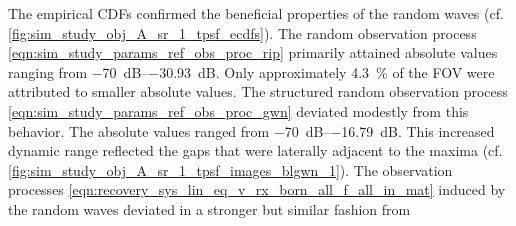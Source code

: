 The empirical \acp{CDF} confirmed
the beneficial properties of
the random waves
(cf. \cref{fig:sim_study_obj_A_sr_1_tpsf_ecdfs}).
The random observation process
\eqref{eqn:sim_study_params_ref_obs_proc_rip} primarily attained
absolute values ranging from
\SIrange{-70}{-30.93}{\deci\bel}.
Only approximately \SI{4.3}{\percent} of
the \ac{FOV} were attributed to
smaller absolute values.
The structured random observation process
\eqref{eqn:sim_study_params_ref_obs_proc_gwn} deviated
modestly from
this behavior.
The absolute values ranged from
\SIrange{-70}{-16.79}{\deci\bel}.
This increased dynamic range reflected
the gaps that were
laterally adjacent to
the maxima
(cf. \cref{fig:sim_study_obj_A_sr_1_tpsf_images_blgwn_1}).
The observation processes
\eqref{eqn:recovery_sys_lin_eq_v_rx_born_all_f_all_in_mat} induced by
the random waves deviated in
a stronger but similar fashion from
